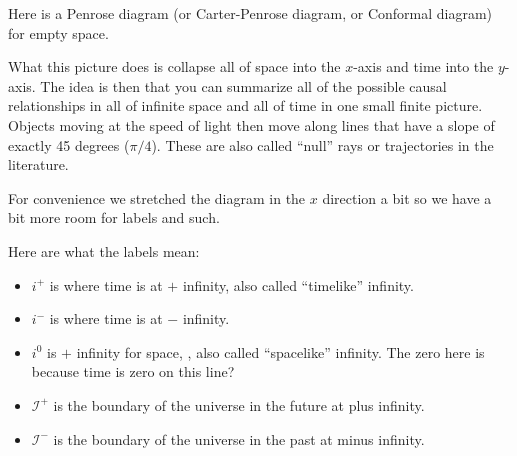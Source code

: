 \documentclass[12pt,border=3pt,tikz]{article}
\def\scri{\mathcal I}
\begin{document}
Here is a Penrose diagram (or Carter-Penrose diagram, or Conformal diagram) for empty space.

\begin{center}
\end{center}

What this picture does is collapse all of space into the $x$-axis and time into the $y$-axis.
The idea is then that you can summarize all of the possible causal relationships in
all of infinite space and all of time in one small finite picture. Objects moving at the speed
of light then move along lines that have a slope of exactly 45 degrees
($\pi/4$). These are also called ``null'' rays or trajectories in the literature.

For convenience we stretched the diagram in the $x$ direction a bit so we have a bit more room for labels
and such. 


Here are what the labels mean:

\begin{itemize}
\item $i^+$ is where time is at $+$ infinity, also called ``timelike'' infinity.
\item $i^-$ is where time is at $-$ infinity.
\item $i^0$ is $+$ infinity for space, , also called ``spacelike'' infinity. The zero here is because
time is zero on this line?
\item $\scri^+$ is the boundary of the universe in the future at plus infinity.
\item $\scri^-$ is the boundary of the universe in the past at minus infinity.
\end{itemize}
\end{document}
